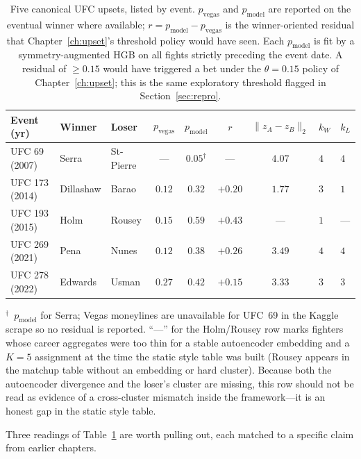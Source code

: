 \documentclass[12pt,oneside]{report}
\begin{document}
\begin{table}[ht]
\centering
\caption{Five canonical UFC upsets, listed by event.  \(p_{\mathrm{vegas}}\)
and \(p_{\mathrm{model}}\) are reported on the eventual winner where
available; \(r = p_{\mathrm{model}} - p_{\mathrm{vegas}}\) is the
winner-oriented residual that Chapter~\ref{ch:upset}'s threshold
policy would have seen.  Each \(p_{\mathrm{model}}\) is fit by a
symmetry-augmented HGB on all fights strictly preceding the event
date.  A residual of $\ge 0.15$ would have triggered a bet under
the \(\theta = 0.15\) policy of Chapter~\ref{ch:upset}; this is the
same exploratory threshold flagged in Section~\ref{sec:repro}.}
\label{tab:cases}
\small
\begin{tabular}{lll cccc ll}
\toprule
Event (yr) & Winner & Loser & \(p_{\mathrm{vegas}}\) & \(p_{\mathrm{model}}\) & \(r\) & \(\lVert z_A - z_B \rVert_2\) & $k_W$ & $k_L$ \\
\midrule
UFC 69 (2007)  & Serra     & St-Pierre & ---    & $0.05^\dagger$ & ---    & $4.07$ & $4$ & $4$ \\
UFC 173 (2014) & Dillashaw & Barao     & $0.12$ & $0.32$         & $+0.20$ & $1.77$ & $3$ & $1$ \\
UFC 193 (2015) & Holm      & Rousey    & $0.15$ & $0.59$         & $+0.43$ & ---    & $1$ & ---  \\
UFC 269 (2021) & Pena      & Nunes     & $0.12$ & $0.38$         & $+0.26$ & $3.49$ & $4$ & $4$ \\
UFC 278 (2022) & Edwards   & Usman     & $0.27$ & $0.42$         & $+0.15$ & $3.33$ & $3$ & $3$ \\
\bottomrule
\end{tabular}

\smallskip
{\footnotesize $^\dagger$~\(p_{\mathrm{model}}\) for Serra; Vegas
moneylines are unavailable for UFC~69 in the Kaggle scrape so no
residual is reported.  ``---'' for the Holm/Rousey row marks
fighters whose career aggregates were too thin for a stable
autoencoder embedding and a \(K = 5\) assignment at the time the
static style table was built (Rousey appears in the matchup table
without an embedding or hard cluster).  Because both the
autoencoder divergence and the loser's cluster are missing, this
row should not be read as evidence of a cross-cluster mismatch
inside the framework---it is an honest gap in the static style
table.}
\end{table}

Three readings of Table~\ref{tab:cases} are worth pulling out, each
matched to a specific claim from earlier chapters.
\end{document}
